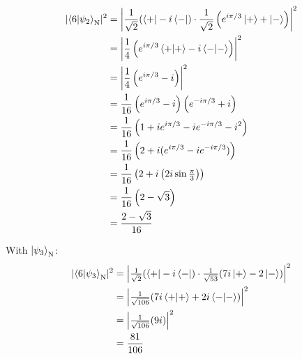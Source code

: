 \documentclass[11pt]{article}
\newcommand\abs[1]{\lvert#1\rvert}
\newcommand\Abs[1]{\left\lvert#1\right\rvert}
\begin{document}
\begin{enumerate}[label=\textbf{\arabic*.}, start=2]
{\begin{enumerate}[label=\textbf{(\alph*)}]
{\begin{align*}
                        \abs{\braket{6|\psi_2}_\mathrm{N}}^2&=\Abs{\frac{1}{\sqrt 2}(\bra{+}-i\bra{-})\cdot\frac{1}{\sqrt 2}\left(e^{i\pi/3}\ket{+}+\ket{-}\right)}^2 \\
                        &=\Abs{\frac 1 4 \left(e^{i\pi/3}\braket{+|+}-i\braket{-|-}\right)}^2 \\
                        &=\Abs{\frac 1 4 \left(e^{i\pi/3}-i\right)}^2 \\
                        &=\frac{1}{16}\left(e^{i\pi/3}-i\right)\left(e^{-i\pi/3}+i\right) \\
                        &=\frac{1}{16}\left(1+ie^{i\pi/3}-ie^{-i\pi/3}-i^2\right) \\
                        &=\frac{1}{16}\left(2+i(e^{i\pi/3}-ie^{-i\pi/3})\right) \\
                        &=\frac{1}{16}\left(2+i\left(2i\sin\tfrac{\pi}{3}\right)\right) \\
                        &=\frac{1}{16}\left(2-\sqrt 3\right) \\
                        &=\frac{2-\sqrt 3}{16}
                    \end{align*}
                    \par
                    With \(\ket{\psi_3}_\mathrm{N}\):
                    \begin{align*}
                        \abs{\braket{6|\psi_3}_\mathrm{N}}^2&=\Abs{\tfrac{1}{\sqrt 2}(\bra{+}-i\bra{-})\cdot\tfrac{1}{\sqrt{53}}(7i\ket{+}-2\ket{-})}^2 \\
                        &=\Abs{\tfrac{1}{\sqrt{106}}(7i\braket{+|+}+2i\braket{-|-})}^2 \\
                        &=\Abs{\tfrac{1}{\sqrt{106}}(9i)}^2 \\
                        &=\frac{81}{106}
                    \end{align*}
                }
            \end{enumerate}
        }
    \end{enumerate}
\end{document}

